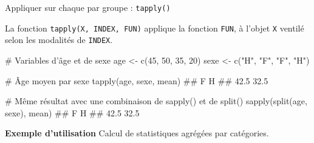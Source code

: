 \documentclass[12pt,ignorenonframetext,]{beamer}
\newenvironment{Shaded}{}{}
\newcommand{\CommentTok}[1]{\textcolor[rgb]{0.00,0.50,0.00}{#1}}
\newcommand{\DecValTok}[1]{#1}
\newcommand{\KeywordTok}[1]{\textcolor[rgb]{0.00,0.00,1.00}{#1}}
\newcommand{\NormalTok}[1]{#1}
\newcommand{\StringTok}[1]{\textcolor[rgb]{0.00,0.50,0.50}{#1}}
\renewenvironment{Shaded}{\begin{snugshade}}{\end{snugshade}}
\newcommand{\intertitre}[1]{\textcolor{redInsee}{\textbf{#1}}}
\begin{document}
\begin{frame}[fragile]{\large Appliquer sur chaque par groupe :
\texttt{tapply()}}
\protect\hypertarget{appliquer-sur-chaque-par-groupe-tapply}{}

La fonction \texttt{tapply(X,\ INDEX,\ FUN)} applique la fonction
\texttt{FUN}, à l’objet \texttt{X} ventilé selon les modalités de
\texttt{INDEX}.

\footnotesize \pause

\begin{Shaded}
\begin{Highlighting}[]
\CommentTok{# Variables d'âge et de sexe}
\NormalTok{age <-}\StringTok{ }\KeywordTok{c}\NormalTok{(}\DecValTok{45}\NormalTok{, }\DecValTok{50}\NormalTok{, }\DecValTok{35}\NormalTok{, }\DecValTok{20}\NormalTok{)}
\NormalTok{sexe <-}\StringTok{ }\KeywordTok{c}\NormalTok{(}\StringTok{"H"}\NormalTok{, }\StringTok{"F"}\NormalTok{, }\StringTok{"F"}\NormalTok{, }\StringTok{"H"}\NormalTok{)}

\CommentTok{# Âge moyen par sexe}
\KeywordTok{tapply}\NormalTok{(age, sexe, mean)}
\NormalTok{  ##    F    H }
\NormalTok{  ## 42.5 32.5}

\CommentTok{# Même résultat avec une combinaison de sapply() et de split()}
\KeywordTok{sapply}\NormalTok{(}\KeywordTok{split}\NormalTok{(age, sexe), mean)}
\NormalTok{  ##    F    H }
\NormalTok{  ## 42.5 32.5}
\end{Highlighting}
\end{Shaded}

\normalsize \pause \vspace{-0.2cm}

\intertitre{Exemple d'utilisation} Calcul de statistiques agrégées par
catégories.

\end{frame}
\end{document}
